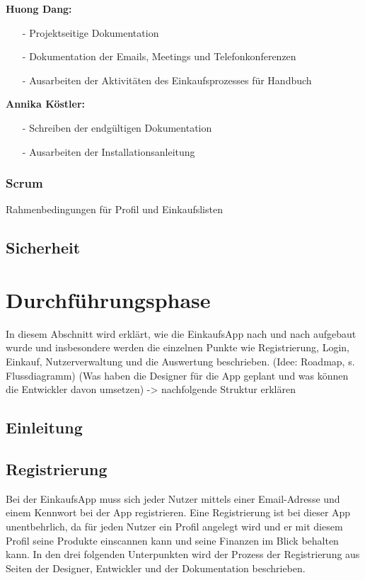 \documentclass[12pt,a4paper]{article}
\begin{document}
\textbf{Huong Dang:}
\begin{itemize}
\item[-] Projektseitige Dokumentation
\item[-] Dokumentation der Emails, Meetings und Telefonkonferenzen
\item[-] Ausarbeiten der Aktivitäten des Einkaufsprozesses für Handbuch 
\end{itemize}

\textbf{Annika Köstler:}
\begin{itemize}
\item[-] Schreiben der endgültigen Dokumentation
\item[-] Ausarbeiten der Installationsanleitung 
\end{itemize}
\newpage

\subsubsection{Scrum}
Rahmenbedingungen für Profil und Einkaufslisten
\newpage
\subsection{Sicherheit}
\newpage
\section{Durchführungsphase}
In diesem Abschnitt wird erklärt, wie die EinkaufsApp nach und nach aufgebaut wurde und insbesondere werden die einzelnen Punkte wie Registrierung, Login, Einkauf, Nutzerverwaltung und die Auswertung beschrieben.
(Idee: Roadmap, s. Flussdiagramm) (Was haben die Designer für die App geplant und was können die Entwickler davon umsetzen) -> nachfolgende Struktur erklären
\subsection*{Einleitung}
\newpage
\subsection{Registrierung}
Bei der EinkaufsApp muss sich jeder Nutzer mittels einer Email-Adresse und einem Kennwort bei der App registrieren.
Eine Registrierung ist bei dieser App unentbehrlich, da für jeden Nutzer ein Profil angelegt wird und er mit diesem Profil seine Produkte einscannen kann und seine Finanzen im Blick behalten kann.
In den drei folgenden Unterpunkten wird der Prozess der Registrierung aus Seiten der Designer, Entwickler und der Dokumentation beschrieben.
\end{document}
